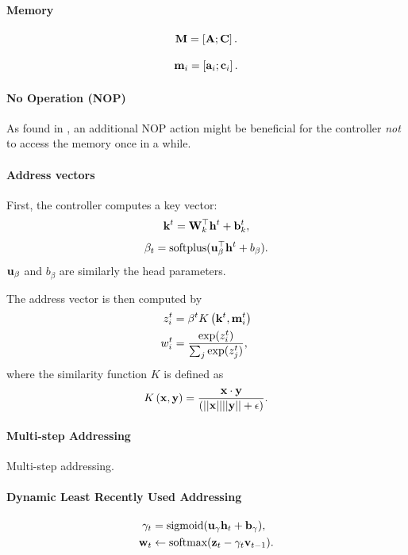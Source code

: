 \documentclass[landscape,a0paper,fontscale=0.285,final]{baposter} %
\begin{document}
\begin{poster}
{\paragraph{Memory}
\[
    \mathbf{M} = \left[ \mathbf{A} ; \mathbf{C} \right].
\]

\[
    \mathbf{m}_i = \left[ \mathbf{a}_i ; \mathbf{c}_i \right].
\]

\paragraph{No Operation (NOP)}

As found in \cite{joulin2015inferring}, an additional NOP action might be beneficial
for the controller {\it not} to access the memory once in a while.

\paragraph{Address vectors}
First, the controller computes a key vector:
\[
    \mathbf{k}^t = \mathbf{W}^\top_k \mathbf{h}^t + \mathbf{b}^t_k,
\]
\[
    \beta_t = \text{softplus}(\mathbf{u}_{\beta}^{\top} \mathbf{h}^t + b_{\beta}).
\]
$\mathbf{u}_{\beta}$ and $b_{\beta}$ are similarly the head parameters.

The address vector is then computed by
\begin{align}
    \label{eq:softmax}
    z_i^t & = \beta^t K\left(\mathbf{k}^t, \mathbf{m}^t_i\right) \\
    w_i^t &= \frac{
        \exp( z_i^t)
    }
    {
        \sum_j \exp( z_j^t )
    },
\end{align}
where the similarity function $K$ is defined as
\[
    K\left(\mathbf{x}, \mathbf{y}\right) = \frac{\mathbf{x} \cdot \mathbf{y}}{(||\mathbf{x}||||\mathbf{y}|| + \epsilon)}.
\]


\paragraph{Multi-step Addressing}

Multi-step addressing.

\paragraph{Dynamic Least Recently Used Addressing}


\begin{align}
       \gamma_t &= \text{sigmoid}(\mathbf{u}_{\gamma} \mathbf{h}_t + \mathbf{b}_{\gamma}),\\
       \mathbf{w}_t &\leftarrow \text{softmax}(\mathbf{z}_t - \gamma_t \mathbf{v}_{t-1}).
\end{align}

}
\end{poster}
\end{document}
